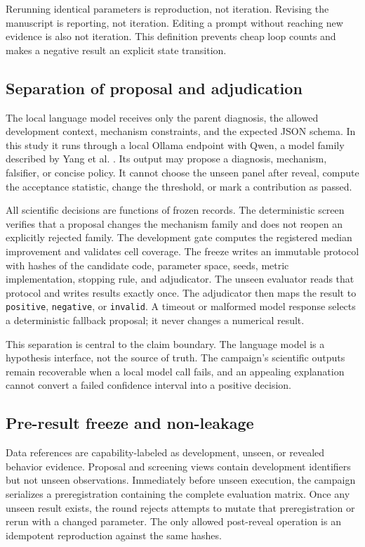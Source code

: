 Rerunning identical parameters is reproduction, not iteration. Revising the
manuscript is reporting, not iteration. Editing a prompt without reaching new
evidence is also not iteration. This definition prevents cheap loop counts
and makes a negative result an explicit state transition.

\subsection{Separation of proposal and adjudication}

The local language model receives only the parent diagnosis, the allowed
development context, mechanism constraints, and the expected JSON schema. In
this study it runs through a local Ollama endpoint with Qwen, a model family
described by Yang et al. \cite{yang2025qwen3}. Its output may propose a
diagnosis, mechanism, falsifier, or concise policy. It cannot choose the
unseen panel after reveal, compute the acceptance statistic, change the
threshold, or mark a contribution as passed.

All scientific decisions are functions of frozen records. The deterministic
screen verifies that a proposal changes the mechanism family and does not
reopen an explicitly rejected family. The development gate computes the
registered median improvement and validates cell coverage. The freeze writes
an immutable protocol with hashes of the candidate code, parameter space,
seeds, metric implementation, stopping rule, and adjudicator. The unseen
evaluator reads that protocol and writes results exactly once. The
adjudicator then maps the result to \texttt{positive}, \texttt{negative}, or
\texttt{invalid}. A timeout or malformed model response selects a
deterministic fallback proposal; it never changes a numerical result.

This separation is central to the claim boundary. The language model is a
hypothesis interface, not the source of truth. The campaign's scientific
outputs remain recoverable when a local model call fails, and an appealing
explanation cannot convert a failed confidence interval into a positive
decision.

\subsection{Pre-result freeze and non-leakage}

Data references are capability-labeled as development, unseen, or revealed
behavior evidence. Proposal and screening views contain development
identifiers but not unseen observations. Immediately before unseen execution,
the campaign serializes a preregistration containing the complete evaluation
matrix. Once any unseen result exists, the round rejects attempts to mutate
that preregistration or rerun with a changed parameter. The only allowed
post-reveal operation is an idempotent reproduction against the same hashes.

